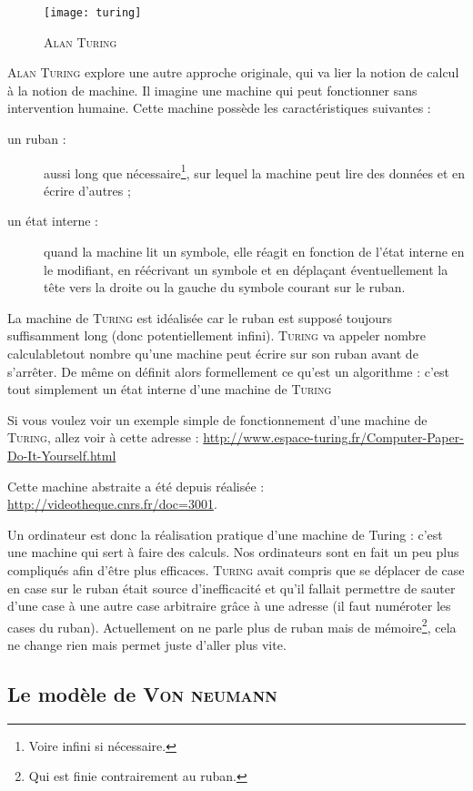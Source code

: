 \begin{figure}
  \centering
  \texttt{[image: turing]}
  \caption{\footnotesize{\textsc{Alan Turing}}}
\end{figure}
\textsc{Alan Turing} explore une autre approche originale, qui va lier la notion de \og calcul \fg à la notion de \og machine\fg. Il imagine une machine qui peut fonctionner sans intervention humaine. Cette machine possède les caractéristiques suivantes :
\begin{description}
\item[un ruban :] aussi long que nécessaire\footnote{Voire infini si nécessaire.}, sur lequel la machine peut lire des données et en écrire d'autres ;
\item [un état interne :] quand la machine lit un symbole, elle réagit en fonction de l'état interne en le modifiant, en réécrivant un symbole et en déplaçant éventuellement la tête vers la droite ou la gauche du symbole courant sur le ruban.
\end{description}
La machine de \textsc{Turing} est idéalisée car le ruban est supposé toujours suffisamment long (donc potentiellement infini). \textsc{Turing} va appeler \og nombre calculable\fg tout nombre qu'une machine peut écrire sur son ruban avant de s'arrêter. De même on définit alors formellement ce qu'est un algorithme  : c'est tout simplement un état interne d'une machine de \textsc{Turing}\par
Si vous voulez voir un exemple simple de fonctionnement d'une machine de \textsc{Turing}, allez voir à cette adresse : \url{http://www.espace-turing.fr/Computer-Paper-Do-It-Yourself.html}\par
Cette machine abstraite a été depuis réalisée : \url{http://videotheque.cnrs.fr/doc=3001}.\par
Un ordinateur est donc la réalisation pratique d'une machine de Turing : c'est une machine qui sert à faire des calculs. Nos ordinateurs sont en fait un peu plus compliqués afin d'être plus efficaces. \textsc{Turing} avait compris que se déplacer de case en case sur le ruban était source d'inefficacité et qu'il fallait permettre de sauter d'une case à une autre case arbitraire grâce à une adresse (il faut numéroter les cases du ruban). Actuellement on ne parle plus de ruban mais de mémoire\footnote{Qui est finie contrairement au ruban.}, cela ne change rien mais permet juste d'aller plus vite.
\subsection{Le modèle de \textsc{Von neumann}}
